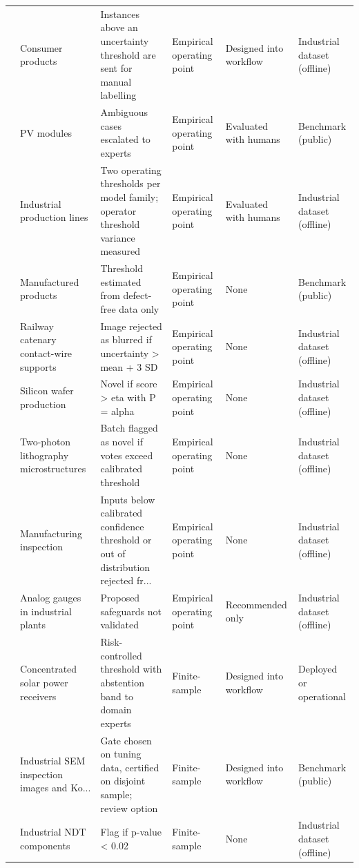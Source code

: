\begin{table}[t]
\begin{tabularx}{\textwidth}{p{}p{}Yp{0.12\textwidth}p{0.12\textwidth}p{0.11\textwidth}}
\cite{rozanec2022streaming} & Consumer products & Instances above an uncertainty threshold are sent for manual labelling & Empirical operating point & Designed into workflow & Industrial dataset (offline) \\
\cite{mistry2026from} & PV modules & Ambiguous cases escalated to experts & Empirical operating point & Evaluated with humans & Benchmark (public) \\
\cite{mikayilov2025development} & Industrial production lines & Two operating thresholds per model family; operator threshold variance measured & Empirical operating point & Evaluated with humans & Industrial dataset (offline) \\
\cite{hecklerkram2026the} & Manufactured products & Threshold estimated from defect-free data only & Empirical operating point & None & Benchmark (public) \\
\cite{kang2019contact} & Railway catenary contact-wire supports & Image rejected as blurred if uncertainty > mean + 3 SD & Empirical operating point & None & Industrial dataset (offline) \\
\cite{frittoli2022deep} & Silicon wafer production & Novel if score > eta with P = alpha & Empirical operating point & None & Industrial dataset (offline) \\
\cite{jia2026adaptive} & Two-photon lithography microstructures & Batch flagged as novel if votes exceed calibrated threshold & Empirical operating point & None & Industrial dataset (offline) \\
\cite{abbassi2024trimming} & Manufacturing inspection & Inputs below calibrated confidence threshold or out of distribution rejected fr... & Empirical operating point & None & Industrial dataset (offline) \\
\cite{mueez2026vision} & Analog gauges in industrial plants & Proposed safeguards not validated & Empirical operating point & Recommended only & Industrial dataset (offline) \\
\cite{estievenart2025risk} & Concentrated solar power receivers & Risk-controlled threshold with abstention band to domain experts & Finite-sample & Designed into workflow & Deployed or operational \\
\cite{yang2026saferestore} & Industrial SEM inspection images and Ko... & Gate chosen on tuning data, certified on disjoint sample; review option & Finite-sample & Designed into workflow & Benchmark (public) \\
\cite{estermann2026unsupervised} & Industrial NDT components & Flag if p-value < 0.02 & Finite-sample & None & Industrial dataset (offline) \\

\end{tabularx}
\end{table}
